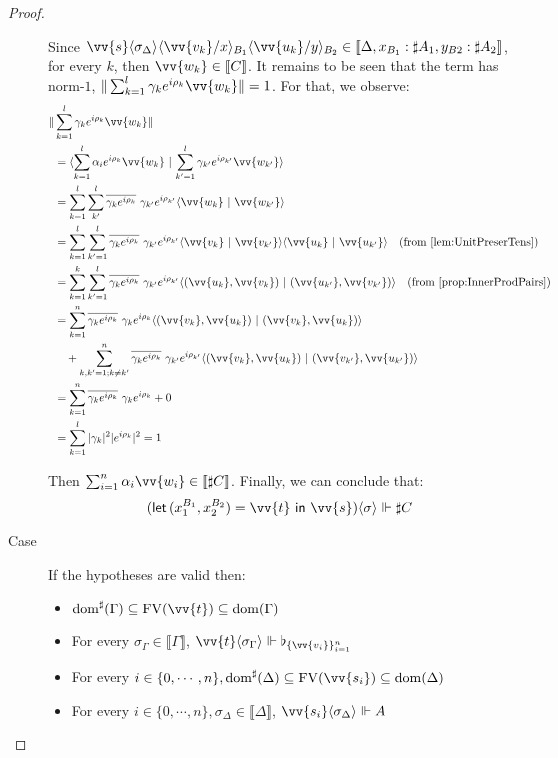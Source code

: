 \documentclass[runningheads,orivec,envcountsame,envcountsect]{llncs}
\newcommand\ansubst[2]{\ensuremath{\langle #1 \rangle_{#2}}}
\newcommand\dom[1]{\mathrm{dom}(#1)}
\newcommand\sdom[1]{\mathrm{dom}^{\sharp}(#1)}
\newcommand\FV[1]{\mathrm{FV}(#1)}
\def\scal#1#2{\langle{#1}~|~{#2}\rangle}
\def\Pair#1#2{(#1,#2)} %
\def\letkeyword{\mathsf{let}}
\def\inkeyword{\mathsf{in}}
\def\LetP#1#2#3#4#5#6{\letkeyword\,\Pair{#1^{#2}}{#3^{#4}}=#5~\inkeyword~#6}
\def\sem#1{\llbracket#1\rrbracket}
\def\real{\Vdash}
\newcommand\basis[1]{\ensuremath{\flat_{#1}}}
\newcommand\genbasis[3]{\ensuremath{\basis{\{#1\}_{#2}^{#3}}}}
\begin{document}
\begin{proof}
\begin{description}
    Since $\vv{s}\ansubst{\sigma_\Delta}{}\ansubst{\vv{v_k}/x}{B_1}\ansubst{\vv{u_k}/y}{B_2}\in\sem{\Delta, x_{B_1}:\sharp A_1, y_{B2}:\sharp A_2}$, for every $k$, then $\vv{w_k}\in\sem{C}$. It remains to be seen that the term has norm-$1$, $\|\sum_{k=1}^{l}\gamma_k e^{i\rho_k} \vv{w_k}\|=1$. For that, we observe:
    \begin{align*}
        \|&\sum_{k=1}^{l}\gamma_k e^{i\rho_k} \vv{w_k}\| \\
        &= \scal{\sum_{k=1}^{l}\alpha_i e^{i\rho_k} \vv{w_k}}{\sum_{k'=1}^{l}\gamma_{k'} e^{i\rho_{k'}} \vv{w_{k'}}}\\
        &= \sum_{k=1}^{l}\sum_{k'}^{l}\overline{\gamma_k e^{i\rho_k}}\  \gamma_{k'} e^{i\rho_{k'}}\scal{\vv{w_k}}{\vv{w_{k'}}}\\
        &=\sum_{k=1}^{l}\sum_{k'=1}^{l}\overline{\gamma_k e^{i\rho_k}}\ \gamma_{k'} e^{i\rho_{k'}} \scal{\vv{v_k}}{\vv{v_{k'}}}\scal{\vv{u_k}}{\vv{u_{k'}}}\quad(\text{from \Cref{lem:UnitPreserTens}})\\
        &= \sum_{k=1}^{k}\sum_{k'=1}^{l}\overline{\gamma_k e^{i\rho_k}}\  \gamma_{k'} e^{i\rho_{k'}} \scal{\Pair{\vv{u_k}}{\vv{v_k}}}{\Pair{\vv{u_{k'}}}{\vv{v_{k'}}}}\quad(\text{from \Cref{prop:InnerProdPairs}})\\
        &=\sum_{k=1}^n \overline{\gamma_k e^{i\rho_k}}\ \gamma_k e^{i\rho_k} \scal{\Pair{\vv{v_k}}{\vv{u_k}}}{\Pair{\vv{v_k}}{\vv{u_k}}} \\
        & \quad + \sum_{k,k'=1; k\neq k'}^n \overline{\gamma_k e^{i\rho_k}}\  \gamma_{k'} e^{i\rho_{k'}} \scal{\Pair{\vv{v_k}}{\vv{u_k}}}{\Pair{\vv{v_{k'}}}{\vv{u_{k'}}}}\\
        &= \sum_{k=1}^n \overline{\gamma_k e^{i\rho_k}}\ \gamma_k e^{i\rho_k} + 0 \\
        &= \sum_{k=1}^{l} |\gamma_k|^2 |e^{i\rho_k}|^2 = 1
    \end{align*}

    Then $\sum_{i=1}^{n}\alpha_i\vv{w_i}\in\sem{\sharp C}$. Finally, we can conclude that: 
    \[(\LetP{x_1}{B_1}{x_2}{B_2}{\vv{t}}{\vv{s}})\ansubst{\sigma}{}\real{\sharp C}\]

    \item[Case] If the hypotheses are valid then:
    \begin{itemize}
        \item $\sdom{\Gamma}\subseteq \FV{\vv{t}}\subseteq \dom{\Gamma}$
        \item For every $\sigma_\Gamma\in\sem{\Gamma}$, $\vv{t}\ansubst{\sigma_\Gamma}{}\real\genbasis{\vv{v_i}}{i=1}{n}$
        \item For every $i\in\{0,\dotsb ,n\}, \sdom{\Delta}\subseteq \FV{\vv{s_i}}\subseteq \dom{\Delta}$
        \item For every $i\in\{0,\dotsb ,n\}, \sigma_\Delta\in\sem{\Delta}$, $\vv{s_i}\ansubst{\sigma_\Delta}{}\real A$
    \end{itemize}


\end{description}
\end{proof}
\end{document}
